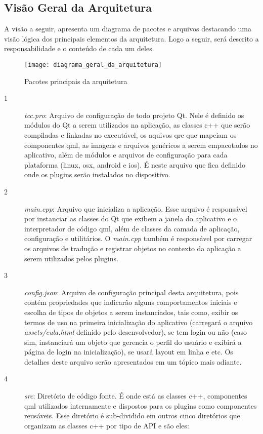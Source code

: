 \subsection{Visão Geral da Arquitetura}
A visão a seguir, apresenta um diagrama de pacotes e arquivos destacando uma visão lógica dos principais elementos da arquitetura. Logo a seguir, será descrito a responsabilidade e o conteúdo de cada um deles.

\begin{figure}[H]
	\texttt{[image: diagrama\_geral\_da\_arquitetura]}
	\centering
	\caption{Pacotes principais da arquitetura}
\end{figure}

\begin{description}
	\item[1] \textit{tcc.pro}: Arquivo de configuração de todo projeto Qt. Nele é definido os módulos do Qt a serem utilizados na aplicação, as classes c++ que serão compiladas e linkadas no executável, os aquivos qrc que mapeiam os componentes qml, as imagens e arquivos genéricos a serem empacotados no aplicativo, além de módulos e arquivos de configuração para cada plataforma (linux, osx, android e ios). É neste arquivo que fica definido onde os plugins serão instalados no dispositivo.

	\item[2] \textit{main.cpp}: Arquivo que inicializa a aplicação. Esse arquivo é responsável por instanciar as classes do Qt que exibem a janela do aplicativo e o interpretador de código qml, além de classes da camada de aplicação, configuração e utilitários. O \textit{main.cpp} também é responsável por carregar os arquivos de tradução e registrar objetos no contexto da aplicação a serem utilizados pelos plugins.

	\item[3] \textit{config.json}: Arquivo de configuração principal desta arquitetura, pois contém propriedades que indicarão alguns comportamentos iniciais e escolha de tipos de objetos a serem instanciados, tais como, exibir os termos de uso na primeira inicialização do aplicativo (carregará o arquivo \textit{assets/eula.html} definido pelo desenvolvedor), se tem login ou não (caso sim, instanciará um objeto que gerencia o perfil do usuário e exibirá a página de login na inicialização), se usará layout em linha e etc. Os detalhes deste arquivo serão apresentados em um tópico mais adiante.

	\item[4] \textit{src}: Diretório de código fonte. É onde está as classes c++, componentes qml utilizados internamente e dispostos para os plugins como componentes reusáveis. Esse diretório é sub-dividido em outros cinco diretórios que organizam as classes c++ por tipo de API e são eles:


\end{description}
